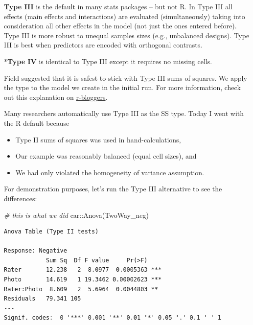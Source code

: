 \documentclass[
  11pt,
]{book}
\newenvironment{Shaded}{\begin{snugshade}}{\end{snugshade}}
\newcommand{\CommentTok}[1]{\textcolor[rgb]{0.56,0.35,0.01}{\textit{#1}}}
\newcommand{\FunctionTok}[1]{\textcolor[rgb]{0.00,0.00,0.00}{#1}}
\newcommand{\NormalTok}[1]{#1}
\newcommand{\SpecialCharTok}[1]{\textcolor[rgb]{0.00,0.00,0.00}{#1}}
\providecommand{\tightlist}{%
  \setlength{\itemsep}{0pt}\setlength{\parskip}{0pt}}
\begin{document}
\textbf{Type III} is the default in many stats packages -- but not R. In Type III all effects (main effects and interactions) are evaluated (simultaneously) taking into consideration all other effects in the model (not just the ones entered before). Type III is more robust to unequal samples sizes (e.g., unbalanced designs). Type III is best when predictors are encoded with orthogonal contrasts.

*\textbf{Type IV} is identical to Type III except it requires no missing cells.

Field \citeyearpar{field_discovering_2012} suggested that it is safest to stick with Type III sums of squares. We apply the type to the model we create in the initial run. For more information, check out this explanation on \href{https://www.r-bloggers.com/2011/03/anova-\%E2\%80\%93-type-iiiiii-ss-explained/}{r-bloggers}.

Many researchers automatically use Type III as the SS type. Today I went with the R default because

\begin{itemize}
\tightlist
\item
  Type II sums of squares was used in hand-calculations,
\item
  Our example was reasonably balanced (equal cell sizes), and
\item
  We had only violated the homogeneity of variance assumption.
\end{itemize}

For demonstration purposes, let's run the Type III alternative to see the differences:

\begin{Shaded}
\begin{Highlighting}[]
\CommentTok{\# this is what we did}
\NormalTok{car}\SpecialCharTok{::}\FunctionTok{Anova}\NormalTok{(TwoWay\_neg)}
\end{Highlighting}
\end{Shaded}

\begin{verbatim}
Anova Table (Type II tests)

Response: Negative
            Sum Sq  Df F value     Pr(>F)    
Rater       12.238   2  8.0977  0.0005363 ***
Photo       14.619   1 19.3462 0.00002623 ***
Rater:Photo  8.609   2  5.6964  0.0044803 ** 
Residuals   79.341 105                       
---
Signif. codes:  0 '***' 0.001 '**' 0.01 '*' 0.05 '.' 0.1 ' ' 1
\end{verbatim}
\end{document}
